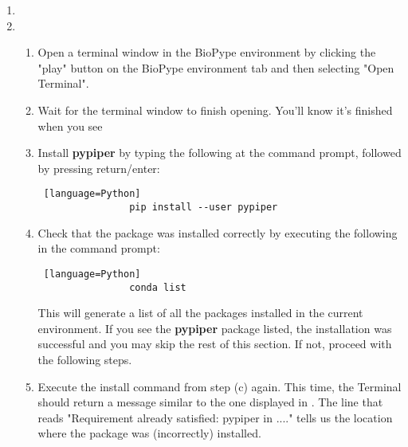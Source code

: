 \begin{enumerate}
\begin{figure}[hbtp]
\begin{center}
        \label{anaconda-install-pack}
        \end{center}
    \end{figure}
        \item {}
        \item {}
        \begin{enumerate}
            \item Open a terminal window in the BioPype environment by clicking the "play" button on the BioPype environment tab and then selecting "Open Terminal".
            \item Wait for the terminal window to finish opening. You'll know it's finished when you see 
            \item Install \textbf{pypiper} by typing the following at the command prompt, followed by pressing return/enter:
            \begin{lstlisting} [language=Python]
                pip install --user pypiper
            \end{lstlisting}
            \item Check that the package was installed correctly by executing the following in the command prompt:
            \begin{lstlisting} [language=Python]
                conda list
            \end{lstlisting}
            This will generate a list of all the packages installed in the current environment. If you see the \textbf{pypiper} package listed, the installation was successful and you may skip the rest of this section. If not, proceed with the following steps.
            \item Execute the install command from step (c) again. This time, the Terminal should return a message similar to the one displayed in . The line that reads "Requirement already satisfied: pypiper in ...." tells us the location where the package was (incorrectly) installed. 

\end{enumerate}
\end{enumerate}
